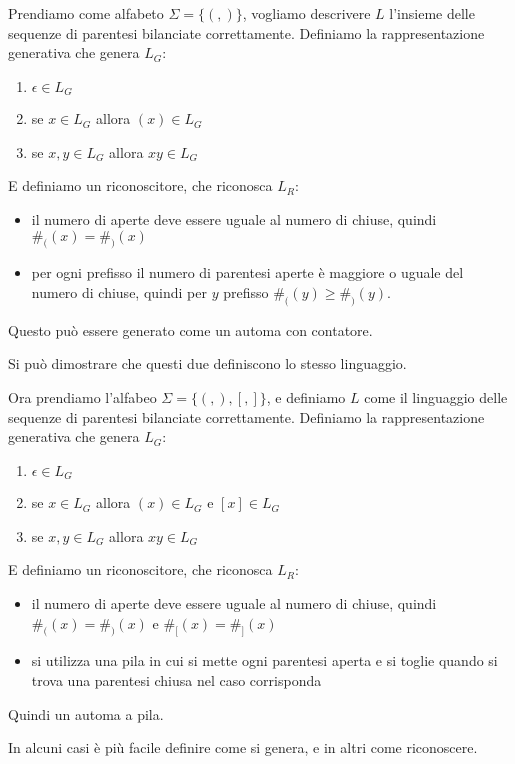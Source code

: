 \documentclass[12pt]{report}
\begin{document}
\begin{tcolorbox}
 	Prendiamo come alfabeto $\Sigma = \{ (, ) \}$, vogliamo descrivere $L$ l'insieme delle sequenze di parentesi bilanciate correttamente.
 	Definiamo la rappresentazione generativa che genera $L_G$:
 	\begin{enumerate}
 		\item $\epsilon \in L_G$
 		\item se $x \in L_G$ allora $(x) \in L_G$
 		\item se $x, y \in L_G$ allora $xy \in L_G$
 	\end{enumerate}
 
 	E definiamo un riconoscitore, che riconosca $L_R$:
 	\begin{itemize}
 		\item il numero di aperte deve essere uguale al numero di chiuse, quindi $\#_((x) = \#_)(x)$
 		\item per ogni prefisso il numero di parentesi aperte è maggiore o uguale del numero di chiuse, quindi per $y$ prefisso $\#_((y) \geq \#_)(y)$.
	\end{itemize}
 	Questo può essere generato come un automa con contatore.
 
 	Si può dimostrare che questi due definiscono lo stesso linguaggio. %
\end{tcolorbox}

\begin{tcolorbox}
	Ora prendiamo l'alfabeo $\Sigma = \{(, ), [, ]\}$, e definiamo $L$ come il linguaggio delle sequenze di parentesi bilanciate correttamente.
	Definiamo la rappresentazione generativa che genera $L_G$:
	\begin{enumerate}
		\item $\epsilon \in L_G$
		\item se $x \in L_G$ allora $(x) \in L_G$ e $[x] \in L_G$
		\item se $x, y \in L_G$ allora $xy \in L_G$
	\end{enumerate}

	E definiamo un riconoscitore, che riconosca $L_R$:
	\begin{itemize}
		\item il numero di aperte deve essere uguale al numero di chiuse, quindi $\#_((x) = \#_)(x)$ e $\#_[(x) = \#_](x)$
		\item si utilizza una pila in cui si mette ogni parentesi aperta e si toglie quando si trova una parentesi chiusa nel caso corrisponda
	\end{itemize}
	Quindi un automa a pila.

	In alcuni casi è più facile definire come si genera, e in altri come riconoscere.
\end{tcolorbox}
\end{document}
